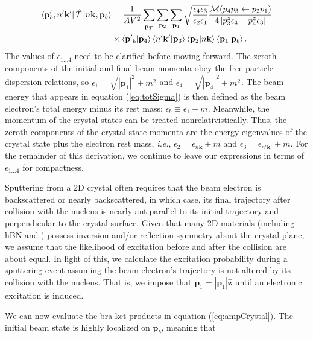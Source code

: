 \documentclass[twoside,twocolumn,9pt]{article}
\begin{document}
\begin{equation} 
  \label{eq:ampCrystal} 
  \begin{aligned}
    \bra{\mathbf{p}_b', n'\mathbf{k'}} \hat{T} \ket{n\mathbf{k},\mathbf{p}_b}
    &=
    \frac{1}{AV^2}
    \sum_{\mathbf{p}_3^\perp} \sum_{\mathbf{p}_2} \sum_{\mathbf{p}_1}
    \sqrt{\frac{\epsilon_4\epsilon_3}{\epsilon_2\epsilon_1}}
    \frac{\mathcal{M}(p_4p_3\leftarrow p_2p_1)}
    {4\left|p_3^z\epsilon_4 - p_4^z\epsilon_3\right|}
    \\&\times
    \bra{\mathbf{p'}_b}\ket{\mathbf{p}_4}
    \bra{n'\mathbf{k'}}\ket{\mathbf{p}_3}
    \bra{\mathbf{p}_2}\ket{n\mathbf{k}}
    \bra{\mathbf{p}_1}\ket{\mathbf{p}_b}.
  \end{aligned}
\end{equation}
%
The values of $\epsilon_{1\dots4}$ need to be clarified before moving forward.
The zeroth components of the initial and final beam momenta obey the free
particle dispersion relations, so 
$\epsilon_1 = \sqrt{|\mathbf{p}_1|^2 + m^2}$
and
$\epsilon_4 = \sqrt{|\mathbf{p}_4|^2 + m^2}$.
The beam energy that appears in equation (\ref{eq:totSigma}) is then
defined as the beam electron's total energy minus its rest mass:
$\epsilon_b\equiv\epsilon_1 - m$.
Meanwhile, the momentum of the crystal states can be treated
nonrelativistically.
Thus, the zeroth components of the crystal state momenta
are the energy eigenvalues of the crystal state plus the electron rest mass,
\textit{i.e.},
$\epsilon_2=\epsilon_{n\mathbf{k}} + m$
and
$\epsilon_3=\epsilon_{n'\mathbf{k'}} + m$.
For the remainder of this derivation, we continue to leave our expressions
in terms of $\epsilon_{1\dots4}$ for compactness.

Sputtering from a 2D crystal often requires that the beam electron is
backscattered or nearly backscattered, in which case, its final trajectory
after collision with the nucleus is nearly antiparallel to its initial
trajectory and perpendicular to the crystal surface.
Given that many 2D materials (including hBN and ) possess inversion
and/or reflection symmetry about the crystal plane, we assume that the
likelihood of excitation before and after the collision are about equal.
In light of this, we calculate the excitation probability during a sputtering event
assuming the beam electron's trajectory is not altered by its collision with
the nucleus.
That is, we impose that $\mathbf{p}_1 = |\mathbf{p}_1|\hat{\mathbf{z}}$ until
an electronic excitation is induced.

We can now evaluate the bra-ket products in equation (\ref{eq:ampCrystal}).
The initial beam state is highly localized on $\mathbf{p}_b$, meaning that
\end{document}
